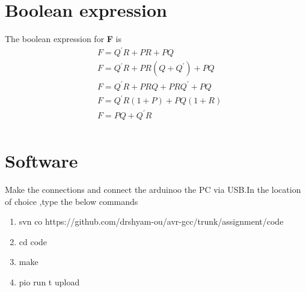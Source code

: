 \documentclass[journal,10pt,twocolumn]{article}
\begin{document}
\section*{\large Boolean expression}
The boolean expression for \textbf{F} is
\begin{align*}%
&F=Q^{\prime}R+PR+PQ\\
&F=Q^{\prime}R+PR(Q+Q^{\prime})+PQ\\
&F=Q^{\prime}R+PRQ+PRQ^{\prime}+PQ\\
&F=Q^{\prime}R(1+P)+PQ(1+R)\\
&F=PQ+Q^{\prime}R\\
\end{align*}

\section*{\large Software}
Make the connections and connect the arduinoo the PC via USB.In the location of choice ,type the below commands
\begin{enumerate}
\item svn co https://github.com/drshyam-ou/avr-gcc/trunk/assignment/code
\item cd code
\item make
\item pio run \-t upload
\end{enumerate}
\end{document}

